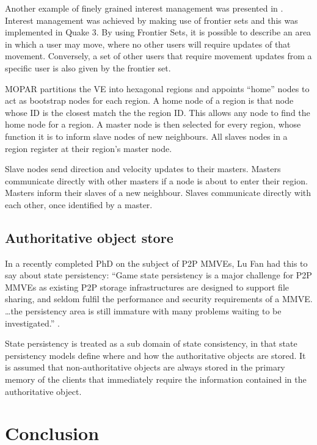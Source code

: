 Another example of finely grained interest management was presented in \cite{IM_frontier_sets}. Interest management was achieved by making use of
frontier sets and this was implemented in Quake 3. By using Frontier Sets, it is possible to describe an area in which a user may move, where no
other users will require updates of that movement. Conversely, a set of other users that require movement updates from a specific user is also
given by the frontier set.

MOPAR partitions the VE into hexagonal regions and appoints ``home'' nodes to act as bootstrap nodes for each region. A home node of a region
is that node whose ID is the closest match the the region ID. This allows any node to find the home node for a region. A master node is then selected
for every region, whose function it is to inform slave nodes of new neighbours. All slaves nodes in a region register at their region's master node.

Slave nodes send direction and velocity updates to their masters. Masters communicate directly with other masters if a node is about to enter their
region. Masters inform their slaves of a new neighbour. Slaves communicate directly with each other, once identified by a master.

\subsection{Authoritative object store}


In a recently completed PhD on the subject of P2P MMVEs, Lu Fan had this to say about state persistency: ``Game state persistency is a major challenge for P2P MMVEs as existing P2P storage infrastructures are designed to support file sharing, and seldom fulfil the performance and security requirements of a MMVE. \ldots the persistency area is still immature with many problems waiting to be investigated.'' \cite{Fan_phd}.

State persistency is treated as a sub domain of state consistency, in that state persistency models define where and how the authoritative
objects are stored. It is assumed that non-authoritative objects are always stored in the primary memory of the clients that immediately require the
information contained in the authoritative object.

\section{Conclusion}

